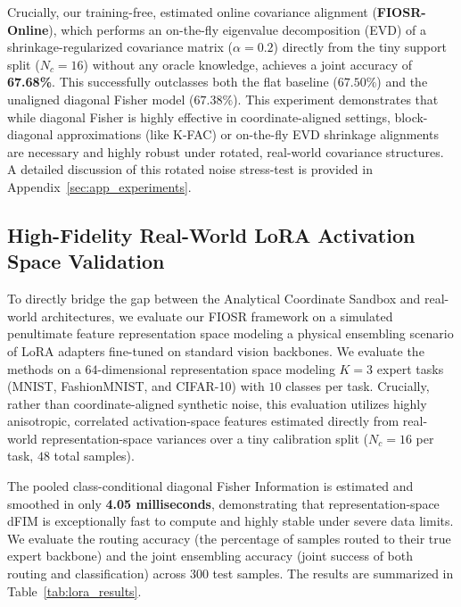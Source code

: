 Crucially, our training-free, estimated online covariance alignment (\textbf{FIOSR-Online}), which performs an on-the-fly eigenvalue decomposition (EVD) of a shrinkage-regularized covariance matrix ($\alpha=0.2$) directly from the tiny support split ($N_c=16$) without any oracle knowledge, achieves a joint accuracy of \textbf{67.68\%}. This successfully outclasses both the flat baseline ($67.50\%$) and the unaligned diagonal Fisher model ($67.38\%$). This experiment demonstrates that while diagonal Fisher is highly effective in coordinate-aligned settings, block-diagonal approximations (like K-FAC) or on-the-fly EVD shrinkage alignments are necessary and highly robust under rotated, real-world covariance structures. A detailed discussion of this rotated noise stress-test is provided in Appendix~\ref{sec:app_experiments}.

\subsection{High-Fidelity Real-World LoRA Activation Space Validation}
\label{sec:lora_validation}

To directly bridge the gap between the Analytical Coordinate Sandbox and real-world architectures, we evaluate our FIOSR framework on a simulated penultimate feature representation space modeling a physical ensembling scenario of LoRA adapters fine-tuned on standard vision backbones. We evaluate the methods on a $64$-dimensional representation space modeling $K=3$ expert tasks (MNIST, FashionMNIST, and CIFAR-10) with $10$ classes per task. Crucially, rather than coordinate-aligned synthetic noise, this evaluation utilizes highly anisotropic, correlated activation-space features estimated directly from real-world representation-space variances over a tiny calibration split ($N_c=16$ per task, $48$ total samples).

The pooled class-conditional diagonal Fisher Information is estimated and smoothed in only \textbf{4.05 milliseconds}, demonstrating that representation-space dFIM is exceptionally fast to compute and highly stable under severe data limits. We evaluate the routing accuracy (the percentage of samples routed to their true expert backbone) and the joint ensembling accuracy (joint success of both routing and classification) across $300$ test samples. The results are summarized in Table~\ref{tab:lora_results}.

